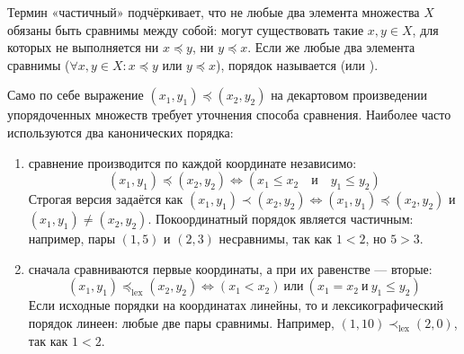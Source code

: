 \begin{remark}
    Термин «частичный» подчёркивает, что не любые два элемента множества $X$ 
    обязаны быть сравнимы между собой: могут существовать такие $x, y \in X$, 
    для которых не выполняется ни $x \preceq y$, ни $y \preceq x$. Если же 
    любые два элемента сравнимы ($\forall x, y \in X : x \preceq y$ или 
    $y \preceq x$), порядок называется  (или 
    ).
\end{remark}

\begin{definition}
    Само по себе выражение $(x_1, y_1) \preceq (x_2, y_2)$ на декартовом 
    произведении упорядоченных множеств требует уточнения способа сравнения. 
    Наиболее часто используются два канонических порядка:
    \begin{enumerate}
        \item {} сравнение 
        производится по каждой координате независимо:
        \begin{equation} \label{eq:coord_order}
            (x_1, y_1) \preceq (x_2, y_2) \iff 
            (x_1 \le x_2 \quad \text{и} \quad y_1 \le y_2) \tag{5}
        \end{equation}
        Строгая версия задаётся как $(x_1, y_1) \prec (x_2, y_2) \iff 
        (x_1, y_1) \preceq (x_2, y_2)$ и $(x_1, y_1) \neq (x_2, y_2)$. 
        Покоординатный порядок является частичным: например, пары $(1, 5)$ 
        и $(2, 3)$ несравнимы, так как $1 < 2$, но $5 > 3$.

        \item {} сначала 
        сравниваются первые координаты, а при их равенстве --- вторые:
        \begin{equation} \label{eq:lex_order}
            (x_1, y_1) \preceq_{\mathrm{lex}} (x_2, y_2) \iff 
            (x_1 < x_2) \ \text{или} \ (x_1 = x_2 \ \text{и} \ y_1 \le y_2) \tag{6}
        \end{equation}
        Если исходные порядки на координатах линейны, то и 
        лексикографический порядок линеен: любые две пары сравнимы. 
        Например, $(1, 10) \prec_{\mathrm{lex}} (2, 0)$, так как $1 < 2$.
    \end{enumerate}
\end{definition}

